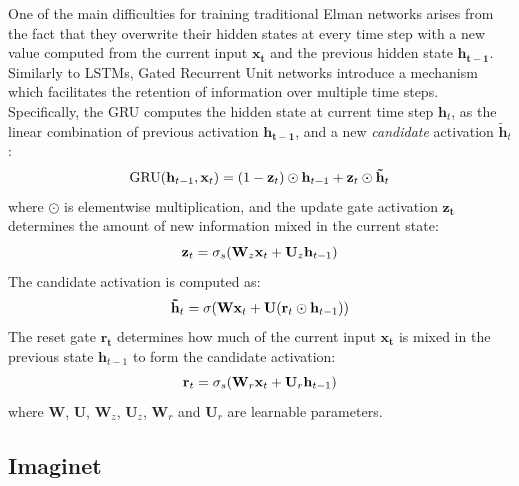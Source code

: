 One of the main difficulties for training traditional Elman networks
arises from the fact that they overwrite their hidden states at every
time step with a new value computed from the current input $\mathbf{x_{t}}$ and
the previous hidden state $\mathbf{h_{t-1}}$. Similarly to LSTMs,
Gated Recurrent Unit networks introduce a mechanism which facilitates the retention of
information over multiple time steps.
Specifically, the GRU computes the hidden state at current time step $\mathbf{h}_{t}$, as the
linear combination of previous activation $\mathbf{h_{t-1}}$, and a new
{\it candidate} activation $\mathbf{\tilde{h}}_t$:
%
\vspace{-.2cm}
\begin{equation}
  \mathrm{GRU}(\mathbf{h}_{t-1}, \mathbf{x}_t) = (1 - \mathbf{z}_t)\odot \mathbf{h}_{t-1} + \mathbf{z}_t \odot \mathbf{\tilde{h}}_t
\vspace{-.1cm}
\end{equation}
%
where $\odot$ is elementwise multiplication, and the update gate
activation $\mathbf{z_{t}}$ determines the amount of new information
mixed in the current state:
%
\vspace{-.1cm}
\begin{equation}
\label{eq:gru-update}
   \mathbf{z}_t = \sigma_s(\mathbf{W}_z \mathbf{x}_t + \mathbf{U}_z \mathbf{h}_{t-1})
\vspace{-.1cm}
\end{equation}
%
The candidate activation is computed as:
%
\vspace{-.2cm}
\begin{equation}
\label{eq:gru-cand}
   \mathbf{\tilde{h}}_t = \sigma(\mathbf{W} \mathbf{x}_t + \mathbf{U}(\mathbf{r}_t \odot \mathbf{h}_{t-1}))
\vspace{-.1cm}
\end{equation}
%
The reset gate $\mathbf{r_{t}}$ determines how much of the current
input $\mathbf{x_{t}}$ is mixed in the previous state
$\mathbf{h}_{t-1}$ to form the candidate activation:
%
\vspace{-.2cm}
\begin{equation}
\label{eq:gru-reset}
   \mathbf{r}_t = \sigma_s(\mathbf{W}_r \mathbf{x}_t + \mathbf{U}_r \mathbf{h}_{t-1})
\vspace{-.1cm}
\end{equation}
where $\mathbf{W}$, $\mathbf{U}$, $\mathbf{W}_z$, $\mathbf{U}_z$, $\mathbf{W}_r$ and $\mathbf{U}_r$ are learnable parameters.



\subsection{Imaginet}
\label{sec:imaginet}



